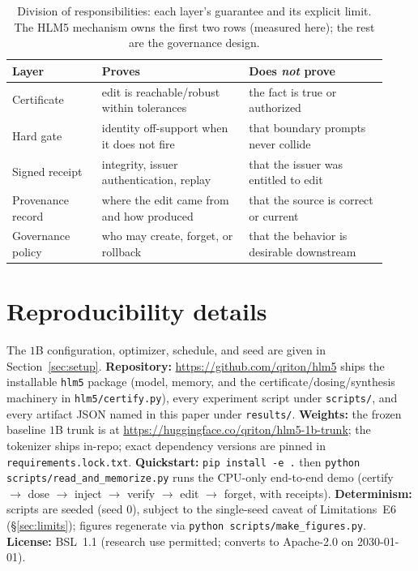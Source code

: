 \documentclass[11pt]{article}
\theoremstyle{remark}
\begin{document}
\begin{table}[t]
\centering\small
\begin{tabular}{p{0.22\linewidth} p{0.36\linewidth} p{0.34\linewidth}}
\toprule
Layer & Proves & Does \emph{not} prove \\
\midrule
Certificate & edit is reachable/robust within tolerances & the fact is true or authorized \\
Hard gate & identity off-support when it does not fire & that boundary prompts never collide \\
Signed receipt & integrity, issuer authentication, replay & that the issuer was entitled to edit \\
Provenance record & where the edit came from and how produced & that the source is correct or current \\
Governance policy & who may create, forget, or rollback & that the behavior is desirable downstream \\
\bottomrule
\end{tabular}
\caption{Division of responsibilities: each layer's guarantee and its explicit
limit. The HLM5 mechanism owns the first two rows (measured here); the rest are the
governance design.}
\label{tab:governance}
\end{table}

\section{Reproducibility details}
The $1$B configuration, optimizer, schedule, and seed are given in
Section~\ref{sec:setup}. \textbf{Repository:} \url{https://github.com/qriton/hlm5}
ships the installable \texttt{hlm5} package (model, memory, and the
certificate/dosing/synthesis machinery in \texttt{hlm5/certify.py}), every
experiment script under \texttt{scripts/}, and every artifact JSON named in this
paper under \texttt{results/}. \textbf{Weights:} the frozen baseline $1$B trunk is
at \url{https://huggingface.co/qriton/hlm5-1b-trunk}; the tokenizer ships in-repo;
exact dependency versions are pinned in \texttt{requirements.lock.txt}.
\textbf{Quickstart:} \texttt{pip install -e .} then
\texttt{python scripts/read\_and\_memorize.py} runs the CPU-only end-to-end demo
(certify $\to$ dose $\to$ inject $\to$ verify $\to$ edit $\to$ forget, with
receipts). \textbf{Determinism:} scripts are seeded (seed $0$), subject to the
single-seed caveat of Limitations~E6 (\S\ref{sec:limits}); figures regenerate via
\texttt{python scripts/make\_figures.py}. \textbf{License:} BSL~1.1 (research use
permitted; converts to Apache-2.0 on 2030-01-01).
\end{document}
